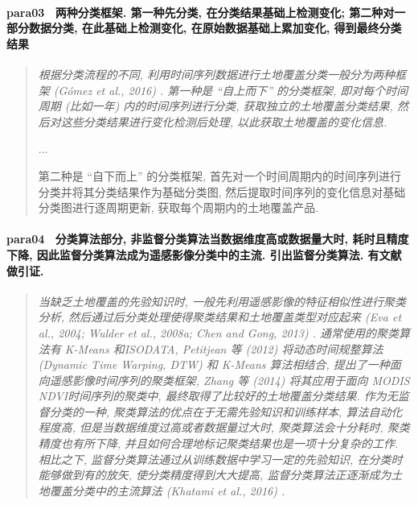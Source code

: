 \paragraph*{para03~
    \textcolor[RGB]{17, 205, 29}{两种分类框架. 第一种先分类, 在分类结果基础上检测变化; 第二种对一部分数据分类, 在此基础上检测变化, 在原始数据基础上累加变化, 得到最终分类结果}}
\begin{quotation}
    \itshape
    根据分类流程的不同, 利用时间序列数据进行土地覆盖分类一般分为两种框架 (Gómez et al., 2016) . 第一种是 ``自上而下'' 的分类框架, 即对每个时间周期 (比如一年) 内的时间序列进行分类, 获取独立的土地覆盖分类结果, 然后对这些分类结果进行变化检测后处理, 以此获取土地覆盖的变化信息.

    ...

    第二种是 ``自下而上'' 的分类框架, 首先对一个时间周期内的时间序列进行分类并将其分类结果作为基础分类图, 然后提取时间序列的变化信息对基础分类图进行逐周期更新, 获取每个周期内的土地覆盖产品. 

\end{quotation}

\paragraph*{para04~
    \textcolor[RGB]{17, 205, 29}{分类算法部分, 非监督分类算法当数据维度高或数据量大时, 耗时且精度下降, 因此监督分类算法成为遥感影像分类中的主流. 引出监督分类算法. 有文献做引证.}}
\begin{quotation}
    \itshape
    当缺乏土地覆盖的先验知识时, 一般先利用遥感影像的特征相似性进行聚类分析, 然后通过后分类处理使得聚类结果和土地覆盖类型对应起来 (Eva et al., 2004; Wulder et al., 2008a; Chen and Gong, 2013) . 通常使用的聚类算法有 K-Means 和ISODATA, Petitjean 等 (2012) 将动态时间规整算法 (Dynamic  Time  Warping, DTW) 和 K-Means 算法相结合, 提出了一种面向遥感影像时间序列的聚类框架, Zhang 等 (2014) 将其应用于面向 MODIS  NDVI时间序列的聚类中, 最终取得了比较好的土地覆盖分类结果. 作为无监督分类的一种, 聚类算法的优点在于无需先验知识和训练样本, 算法自动化程度高, 但是当数据维度过高或者数据量过大时, 聚类算法会十分耗时, 聚类精度也有所下降, 并且如何合理地标记聚类结果也是一项十分复杂的工作. 相比之下, 监督分类算法通过从训练数据中学习一定的先验知识, 在分类时能够做到有的放矢, 使分类精度得到大大提高, 监督分类算法正逐渐成为土地覆盖分类中的主流算法 (Khatami  et  al., 2016) .
\end{quotation}


